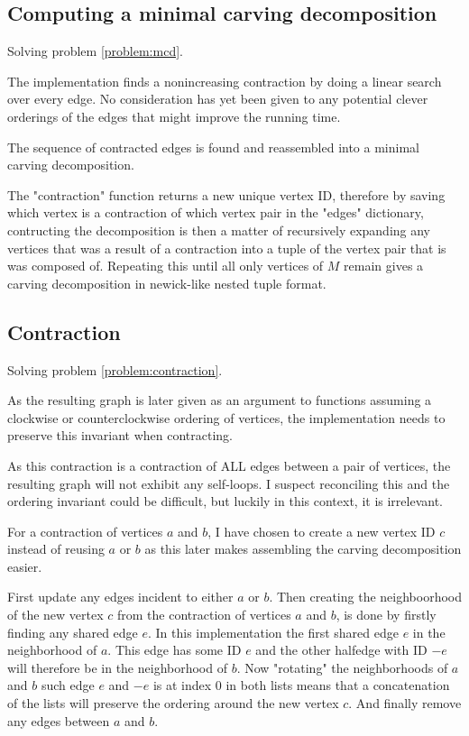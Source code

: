 \documentclass{article}
\begin{document}
	
	\subsection{Computing a minimal carving decomposition}\label{impl:mcd}

		Solving problem \ref{problem:mcd}.

		The implementation finds a nonincreasing contraction by doing a linear search over every edge. No consideration has yet been given to any potential clever orderings of the edges that might improve the running time.

		The sequence of contracted edges is found and reassembled into a minimal carving decomposition.

		The "contraction" function returns a new unique vertex ID, therefore by saving which vertex is a contraction of which vertex pair in the "edges" dictionary, contructing the decomposition is then a matter of recursively expanding any vertices that was a result of a contraction into a tuple of the vertex pair that is was composed of. Repeating this until all only vertices of $M$ remain gives a carving decomposition in newick-like nested tuple format.


	\subsection{Contraction}\label{impl:contraction}

		Solving problem \ref{problem:contraction}.

		As the resulting graph is later given as an argument to functions assuming a clockwise or counterclockwise ordering of vertices, the implementation needs to preserve this invariant when contracting.

		As this contraction is a contraction of ALL edges between a pair of vertices, the resulting graph will not exhibit any self-loops. I suspect reconciling this and the ordering invariant could be difficult, but luckily in this context, it is irrelevant.

		For a contraction of vertices $a$ and $b$, I have chosen to create a new vertex ID $c$ instead of reusing $a$ or $b$ as this later makes assembling the carving decomposition easier.

		First update any edges incident to either $a$ or $b$. Then creating the neighboorhood of the new vertex $c$ from the contraction of vertices $a$ and $b$, is done by firstly finding any shared edge $e$. In this implementation the first shared edge $e$ in the neighborhood of $a$. This edge has some ID $e$ and the other halfedge with ID $-e$ will therefore be in the neighborhood of $b$. Now  "rotating" the neighborhoods of $a$ and $b$ such edge $e$ and $-e$ is at index 0 in both lists means that a concatenation of the lists will preserve the ordering around the new vertex $c$. And finally remove any edges between $a$ and $b$.
		
\end{document}
